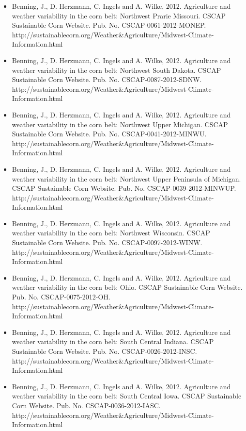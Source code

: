 \begin{itemize}
\item Benning, J., D. Herzmann, C. Ingels and A. Wilke, 2012. Agriculture and weather variability in the corn belt: Northwest Prarie Missouri. CSCAP Sustainable Corn Website. Pub. No. CSCAP-0061-2012-MONEP. http://sustainablecorn.org/Weather\&Agriculture/Midwest-Climate-Information.html

\item Benning, J., D. Herzmann, C. Ingels and A. Wilke, 2012. Agriculture and weather variability in the corn belt: Northwest South Dakota. CSCAP Sustainable Corn Website. Pub. No. CSCAP-0087-2012-SDNW. http://sustainablecorn.org/Weather\&Agriculture/Midwest-Climate-Information.html

\item Benning, J., D. Herzmann, C. Ingels and A. Wilke, 2012. Agriculture and weather variability in the corn belt: Northwest Upper Michigan. CSCAP Sustainable Corn Website. Pub. No. CSCAP-0041-2012-MINWU. http://sustainablecorn.org/Weather\&Agriculture/Midwest-Climate-Information.html

\item Benning, J., D. Herzmann, C. Ingels and A. Wilke, 2012. Agriculture and weather variability in the corn belt: Northwest Upper Peninsula of Michigan. CSCAP Sustainable Corn Website. Pub. No. CSCAP-0039-2012-MINWUP. http://sustainablecorn.org/Weather\&Agriculture/Midwest-Climate-Information.html

\item Benning, J., D. Herzmann, C. Ingels and A. Wilke, 2012. Agriculture and weather variability in the corn belt: Northwest Wisconsin. CSCAP Sustainable Corn Website. Pub. No. CSCAP-0097-2012-WINW. http://sustainablecorn.org/Weather\&Agriculture/Midwest-Climate-Information.html

\item Benning, J., D. Herzmann, C. Ingels and A. Wilke, 2012. Agriculture and weather variability in the corn belt: Ohio. CSCAP Sustainable Corn Website. Pub. No. CSCAP-0075-2012-OH. http://sustainablecorn.org/Weather\&Agriculture/Midwest-Climate-Information.html

\item Benning, J., D. Herzmann, C. Ingels and A. Wilke, 2012. Agriculture and weather variability in the corn belt: South Central Indiana. CSCAP Sustainable Corn Website. Pub. No. CSCAP-0026-2012-INSC. http://sustainablecorn.org/Weather\&Agriculture/Midwest-Climate-Information.html

\item Benning, J., D. Herzmann, C. Ingels and A. Wilke, 2012. Agriculture and weather variability in the corn belt: South Central Iowa. CSCAP Sustainable Corn Website. Pub. No. CSCAP-0036-2012-IASC. http://sustainablecorn.org/Weather\&Agriculture/Midwest-Climate-Information.html


\end{itemize}
